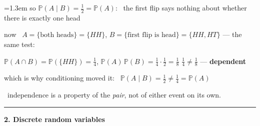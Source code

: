 \documentclass[10pt]{article}
\newcommand{\beat}[2]{%
  \par\bigskip\vspace{4pt}
  {\color{ruleink}\rule{\textwidth}{1pt}}\par\nobreak\vspace{4pt}
  {\large\bfseries #1.\; #2}\par\nobreak\vspace{6pt}}
\newenvironment{board}{%
  \par\vspace{4pt}
  \begingroup\leftskip=1.3em\relax\parskip=2pt\relax}{%
  \par\endgroup\vspace{4pt}}
\begin{document}
\begin{board}
\quad so $\mathbb{P}(A \mid B) = \tfrac12 = \mathbb{P}(A)$: \ the first flip says nothing about whether there is exactly one head
\vspace{8pt}

\quad now \ $A = \{\text{both heads}\} = \{HH\}$, \qquad
      $B = \{\text{first flip is head}\} = \{HH, HT\}$ \quad --- the same test:
\vspace{3pt}

\quad $\mathbb{P}(A \cap B) = \mathbb{P}(\{HH\}) = \tfrac14$, \qquad
      $\mathbb{P}(A)\,\mathbb{P}(B) = \tfrac14 \cdot \tfrac12 = \tfrac18$
\qquad $\tfrac14 \ne \tfrac18$ --- \textbf{dependent}
\vspace{3pt}

\quad which is why conditioning moved it: \ $\mathbb{P}(A \mid B) = \tfrac12 \ne \tfrac14 = \mathbb{P}(A)$
\vspace{6pt}

 \ independence is a property of the
      \emph{pair}, not of either event on its own.
\end{board}
\beat{2}{Discrete random variables}
\end{document}
